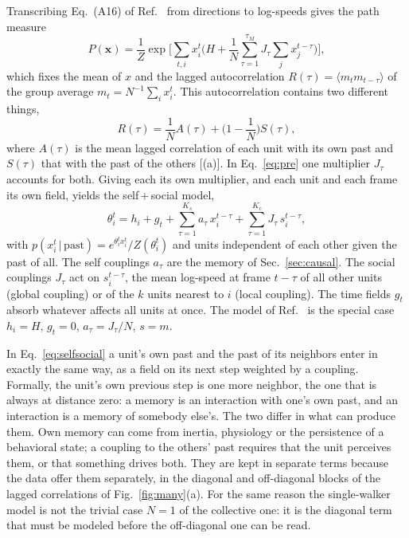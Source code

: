 Transcribing Eq.~(A16) of Ref.~\cite{Agliari2024} from directions to log-speeds gives the path measure
\begin{equation}
P(\mathbf x)=\frac1Z\exp\Big[\sum_{t,i}x_i^t\Big(H+\frac1N\sum_{\tau=1}^{\tau_M}J_\tau\sum_jx_j^{t-\tau}\Big)\Big],
\label{eq:pre}
\end{equation}
which fixes the mean of $x$ and the lagged autocorrelation $R(\tau)=\langle m_tm_{t-\tau}\rangle$ of the group average $m_t=N^{-1}\sum_ix_i^t$. This autocorrelation contains two different things,
\begin{equation}
R(\tau)=\frac1NA(\tau)+\Big(1-\frac1N\Big)S(\tau),
\label{eq:Rsplit}
\end{equation}
where $A(\tau)$ is the mean lagged correlation of each unit with its own past and $S(\tau)$ that with the past of the others [(a)]. In Eq.~\eqref{eq:pre} one multiplier $J_\tau$ accounts for both. Giving each its own multiplier, and each unit and each frame its own field, yields the self\,+\,social model,
\begin{equation}
\theta_i^t=h_i+g_t+\sum_{\tau=1}^{K_s}a_\tau\,x_i^{t-\tau}+\sum_{\tau=1}^{K_c}J_\tau\,s_i^{t-\tau},
\label{eq:selfsocial}
\end{equation}
with $p(x_i^t\,|\,\text{past})=e^{\theta_i^tx_i^t}/Z(\theta_i^t)$ and units independent of each other given the past of all. The self couplings $a_\tau$ are the memory of Sec.~\ref{sec:causal}. The social couplings $J_\tau$ act on $s_i^{t-\tau}$, the mean log-speed at frame $t-\tau$ of all other units (global coupling) or of the $k$ units nearest to $i$ (local coupling). The time fields $g_t$ absorb whatever affects all units at once. The model of Ref.~\cite{Agliari2024} is the special case $h_i=H$, $g_t=0$, $a_\tau=J_\tau/N$, $s=m$.

In Eq.~\eqref{eq:selfsocial} a unit's own past and the past of its neighbors enter in exactly the same way, as a field on its next step weighted by a coupling. Formally, the unit's own previous step is one more neighbor, the one that is always at distance zero: a memory is an interaction with one's own past, and an interaction is a memory of somebody else's. The two differ in what can produce them. Own memory can come from inertia, physiology or the persistence of a behavioral state; a coupling to the others' past requires that the unit perceives them, or that something drives both. They are kept in separate terms because the data offer them separately, in the diagonal and off-diagonal blocks of the lagged correlations of Fig.~\ref{fig:many}(a). For the same reason the single-walker model is not the trivial case $N=1$ of the collective one: it is the diagonal term that must be modeled before the off-diagonal one can be read.
